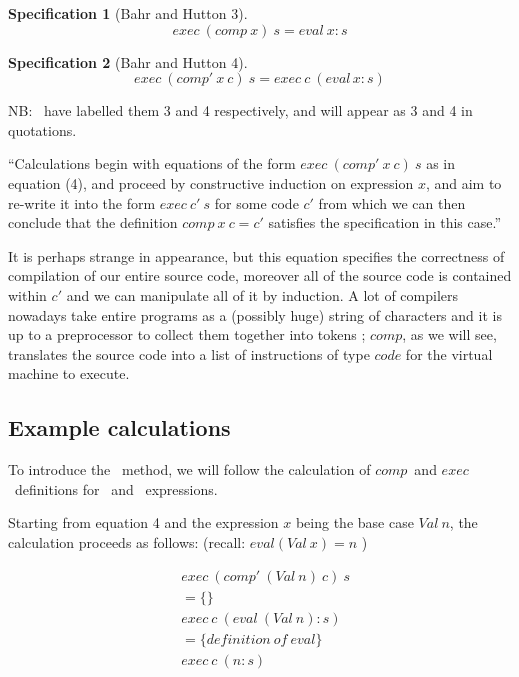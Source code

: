 \documentclass {article}
\begin{document}
\newtheorem{spec}{Specification}
\begin{spec}[Bahr and Hutton 3]
	\[ exec \  (comp \  x) \  s = eval \  x:s \]
\end{spec}
\begin{spec}[Bahr and Hutton 4]
	\[ exec \  (comp' \  x \  c) \ s = exec \  c \  (eval \, x:s) \]
\end{spec}

NB: \BH\ have labelled them 3 and 4 respectively, 
and will appear as 3 and 4 in quotations.

\newcommand{\exec}{$exec$}
\newcommand{\comp}{$comp$}
\newcommand{\compp}{$comp'$}

``Calculations begin with equations
of the form $exec \  (comp' \  x \  c) \  s$
as in equation (4),
and proceed by constructive induction on 
expression $x$, 
and aim to re-write it into the form
$exec \  c' \  s$ for some code $c'$
from which we can then conclude that the definition
$comp \  x \  c = c'$ satisfies the 
specification in this case.''\cite{bandh}

It is perhaps strange in appearance,
but this equation
specifies the correctness of compilation of our entire source code,
moreover all of the source code is contained within  $c'$
and we can manipulate all of it by induction.
A lot of compilers nowadays 
take entire programs as a (possibly huge) string of characters
and it is up to a preprocessor to collect them together into tokens \cite{dragon};
\comp, as we will see, translates the source code into a
list of instructions of type $code$ for the virtual machine to execute.

\subsection{Example calculations}

To introduce the \BH\ method,
we will follow the 
calculation of \comp\ and \exec\ definitions
for \val\ and \add\ expressions\cite[section 2.5]{bandh}.

Starting from equation 4 and the expression $x$
being the base case $Val  \ n$, 
the calculation proceeds as follows\cite{bandh}:
(recall: \( eval (Val \  x) = n  \) )

\begin{align*}
	&exec \ (comp' \ (Val \ n) \ c) \ s \\
	&= \{ \} \\
	&exec \ c \ (eval \ (Val \ n) : s) \\
	&= \{definition \ of \ eval\} \\
	&exec \ c \ (n:s)
\end{align*}
\end{document}
